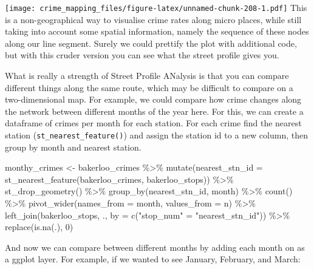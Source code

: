 \documentclass[
  krantz2]{krantz}
\makeatletter
\newenvironment{Shaded}{\begin{snugshade}}{\end{snugshade}}
\newcommand{\AttributeTok}[1]{\textcolor[rgb]{0.61,0.61,0.61}{#1}}
\newcommand{\DecValTok}[1]{\textcolor[rgb]{0.06,0.06,0.06}{#1}}
\newcommand{\FunctionTok}[1]{\textcolor[rgb]{0,0,0}{#1}}
\newcommand{\NormalTok}[1]{#1}
\newcommand{\OtherTok}[1]{\textcolor[rgb]{0.37,0.37,0.37}{#1}}
\newcommand{\SpecialCharTok}[1]{\textcolor[rgb]{0,0,0}{#1}}
\newcommand{\StringTok}[1]{\textcolor[rgb]{0.5,0.5,0.5}{#1}}
\newenvironment{kframe}{%
\medskip{}
\setlength{\fboxsep}{.8em}
 \def\at@end@of@kframe{}%
 \ifinner\ifhmode%
  \def\at@end@of@kframe{\end{minipage}}%
  \begin{minipage}{\columnwidth}%
 \fi\fi%
 \def\FrameCommand##1{\hskip\@totalleftmargin \hskip-\fboxsep
 \colorbox{shadecolor}{##1}\hskip-\fboxsep
     \hskip-\linewidth \hskip-\@totalleftmargin \hskip\columnwidth}%
 \MakeFramed {\advance\hsize-\width
   \@totalleftmargin\z@ \linewidth\hsize
   \@setminipage}}%
 {\par\unskip\endMakeFramed%
 \at@end@of@kframe}
\renewenvironment{Shaded}{\begin{kframe}}{\end{kframe}}
\makeatother
\begin{document}
\texttt{[image: crime\_mapping\_files/figure-latex/unnamed-chunk-208-1.pdf]}
This is a non-geographical way to visualise crime rates along micro places, while still taking into account some spatial information, namely the sequence of these nodes along our line segment. Surely we could prettify the plot with additional code, but with this cruder version you can see what the street profile gives you.

What is really a strength of Street Profile ANalysis is that you can compare different things along the same route, which may be difficult to compare on a two-dimensional map. For example, we could compare how crime changes along the network between different months of the year here. For this, we can create a dataframe of crimes per month for each station. For each crime find the nearest station (\texttt{st\_nearest\_feature()}) and assign the station id to a new column, then group by month and nearest station.

\begin{Shaded}
\begin{Highlighting}[]
\NormalTok{monthy\_crimes }\OtherTok{\textless{}{-}}\NormalTok{ bakerloo\_crimes }\SpecialCharTok{\%\textgreater{}\%} 
  \FunctionTok{mutate}\NormalTok{(}\AttributeTok{nearest\_stn\_id =} \FunctionTok{st\_nearest\_feature}\NormalTok{(bakerloo\_crimes, bakerloo\_stops)) }\SpecialCharTok{\%\textgreater{}\%} 
  \FunctionTok{st\_drop\_geometry}\NormalTok{() }\SpecialCharTok{\%\textgreater{}\%} 
  \FunctionTok{group\_by}\NormalTok{(nearest\_stn\_id, month) }\SpecialCharTok{\%\textgreater{}\%} 
  \FunctionTok{count}\NormalTok{() }\SpecialCharTok{\%\textgreater{}\%} 
  \FunctionTok{pivot\_wider}\NormalTok{(}\AttributeTok{names\_from =}\NormalTok{ month, }\AttributeTok{values\_from =}\NormalTok{ n)  }\SpecialCharTok{\%\textgreater{}\%} 
  \FunctionTok{left\_join}\NormalTok{(bakerloo\_stops, ., }\AttributeTok{by =} \FunctionTok{c}\NormalTok{(}\StringTok{"stop\_num"} \OtherTok{=} \StringTok{"nearest\_stn\_id"}\NormalTok{)) }\SpecialCharTok{\%\textgreater{}\%} 
  \FunctionTok{replace}\NormalTok{(}\FunctionTok{is.na}\NormalTok{(.), }\DecValTok{0}\NormalTok{)}
\end{Highlighting}
\end{Shaded}

And now we can compare between different months by adding each month on as a ggplot layer. For example, if we wanted to see January, February, and March:
\end{document}
